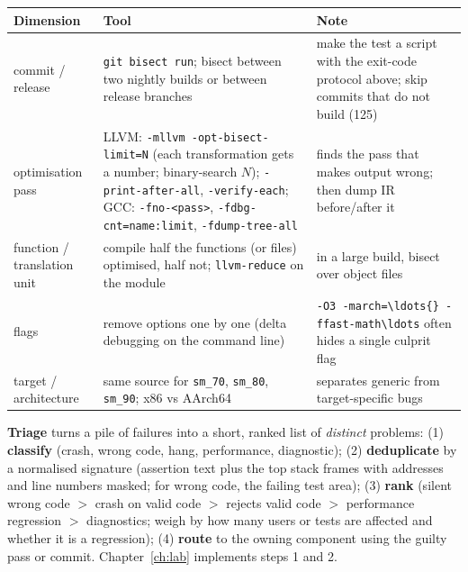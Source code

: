 \documentclass[10pt,a4paper,openany,oneside]{report}
\begin{document}
\begin{center}\small
\begin{xltabular}{\textwidth}{@{}L{3.4cm}L{5.1cm}Y@{}}
\toprule
\textbf{Dimension} & \textbf{Tool} & \textbf{Note}\\
\midrule\endhead
commit / release & \texttt{git bisect run}; bisect between two nightly builds or between release branches & make the test a script with the exit-code protocol above; skip commits that do not build (125)\\
optimisation pass & LLVM: \texttt{-mllvm -opt-bisect-limit=N} (each transformation gets a number; binary-search $N$); \texttt{-print-after-all}, \texttt{-verify-each}; GCC: \texttt{-fno-<pass>}, \texttt{-fdbg-cnt=name:limit}, \texttt{-fdump-tree-all} & finds the pass that makes output wrong; then dump IR before/after it\\
function / translation unit & compile half the functions (or files) optimised, half not; \texttt{llvm-reduce} on the module & in a large build, bisect over object files\\
flags & remove options one by one (delta debugging on the command line) & \texttt{-O3 -march=\textbackslash{}ldots\{\} -ffast-math\textbackslash{}ldots} often hides a single culprit flag\\
target / architecture & same source for \texttt{sm\_70}, \texttt{sm\_80}, \texttt{sm\_90}; x86 vs AArch64 & separates generic from target-specific bugs\\
\bottomrule
\end{xltabular}
\end{center}
\textbf{Triage} turns a pile of failures into a short, ranked list of \emph{distinct} problems: (1) \textbf{classify} (crash, wrong code, hang, performance, diagnostic); (2) \textbf{deduplicate} by a normalised signature (assertion text plus the top stack frames with addresses and line numbers masked; for wrong code, the failing test area); (3) \textbf{rank} (silent wrong code $>$ crash on valid code $>$ rejects valid code $>$ performance regression $>$ diagnostics; weigh by how many users or tests are affected and whether it is a regression); (4) \textbf{route} to the owning component using the guilty pass or commit. Chapter~\ref{ch:lab} implements steps 1 and 2.
\end{document}
